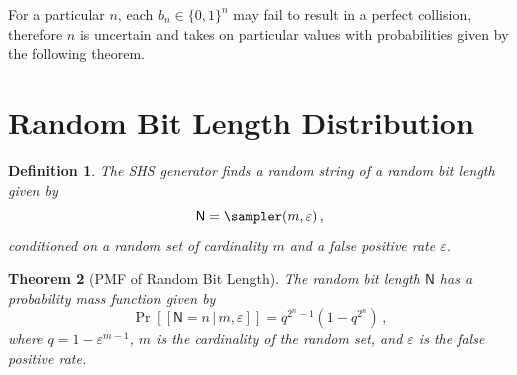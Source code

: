 \documentclass[11pt,a4paper]{article}
\newtheorem{theorem}{Theorem}
\newtheorem{definition}[theorem]{Definition}
\newcommand{\RV}[1]{\mathsf{#1}}           %
\newcommand{\PDF}[2][]{\Pr\left[#2\right]} %
\newcommand{\fprate}{\varepsilon}          %
\newcommand{\BitSet}{\{0,1\}}              %
\newcommand{\Given}{\,|\,}
\begin{document}
For a particular $n$, each $b_n \in \BitSet^n$ may fail to result in a perfect collision, therefore $n$ is uncertain and takes on particular values with probabilities given by the following theorem.

\section{Random Bit Length Distribution}

\begin{definition}
\label{def:N_pmf}
The SHS generator finds a random string of a random bit length given by
\begin{equation}
    \RV{N} = \sampler(m, \fprate)\,,
\end{equation}
conditioned on a random set of cardinality $m$ and a false positive rate $\fprate$.
\end{definition}

\begin{theorem}[PMF of Random Bit Length]
\label{thm:N_pmf}
The random bit length $\RV{N}$ has a probability mass function given by
\begin{equation}
\label{eq:N_pmf}
    \PDF{[\RV{N} = n \Given m, \fprate]} = q^{2^n-1}\left(1 - q^{2^n}\right)\,,
\end{equation}
where $q = 1 - \fprate^{m-1}$, $m$ is the cardinality of the random set, and $\fprate$ is the false positive rate.
\end{theorem}
\end{document}
